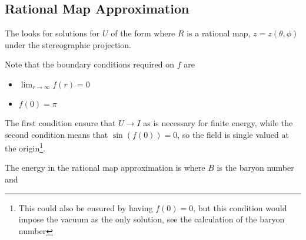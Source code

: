 \documentclass{article}
\begin{document}
\subsection{Rational Map Approximation}

\begin{definition}
The  looks for solutions for $U$ of the form 
where $R$ is a rational map, $z=z(\theta,\phi)$ under the stereographic projection.
\end{definition}

Note that the boundary conditions required on $f$ are 
\begin{itemize}
    \item $\lim_{r \to \infty} f(r) = 0$
    \item $f(0) = \pi$
\end{itemize}
The first condition ensure that $U\to I$ as is necessary for finite energy, while the second condition means that $\sin(f(0)) = 0$, so the field is single valued at the origin\footnote{This could also be ensured by having $f(0) = 0$, but this condition would impose the vacuum as the only solution, see the calculation of the baryon number}. 
\begin{prop}
The energy in the rational map approximation is 
where $B$ is the baryon number and 
\end{prop}
\end{document}
